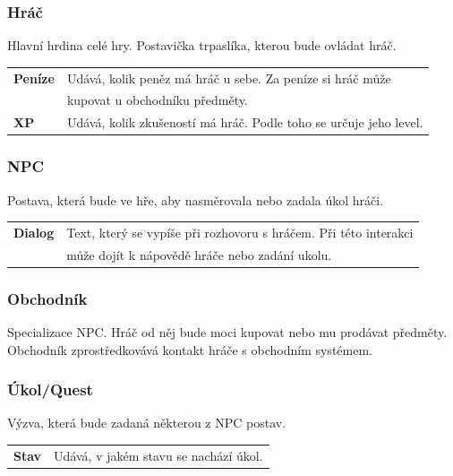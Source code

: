 \documentclass[12pt,a4paper]{article}
\begin{document}
\subsubsection{Hráč}
Hlavní hrdina celé hry. Postavička trpaslíka, kterou bude ovládat hráč.\\[5pt]

\begin{tabular*}{0.87\textwidth}{ll}
  \bf Peníze & Udává, kolik peněz má hráč u sebe. Za peníze si hráč může\\
             & kupovat u obchodníku předměty. \\[7pt]
  \bf XP & Udává, kolik zkušeností má hráč. Podle toho se určuje jeho level.\\[7pt]
\end{tabular*}

\subsubsection{NPC}
Postava, která bude ve hře, aby nasměrovala nebo zadala úkol hráči. \\[5pt]

\begin{tabular*}{0.87\textwidth}{ll}
  \bf Dialog & Text, který se vypíše při rozhovoru s hráčem. Při této interakci \\
             & může dojít k nápovědě hráče nebo zadání ukolu. \\[7pt]
\end{tabular*}

\subsubsection{Obchodník}
Specializace NPC. Hráč od něj bude moci kupovat nebo mu prodávat předměty.
Obchodník zprostředkovává kontakt hráče s obchodním systémem.

\subsubsection{Úkol/Quest}
Výzva, která bude zadaná některou z NPC postav.\\[5pt]

\begin{tabular*}{0.55\textwidth}{ll}
  \bf Stav & Udává, v jakém stavu se nachází úkol.\\[7pt]
\end{tabular*}
\end{document}
